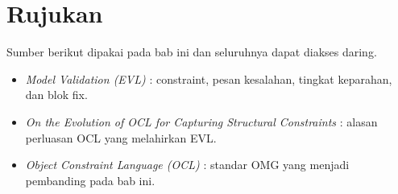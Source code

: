 \section{Rujukan}

Sumber berikut dipakai pada bab ini dan seluruhnya dapat diakses daring.

\begin{itemize}
  \item \textit{Model Validation (EVL)} \cite{doc-evl}: constraint, pesan kesalahan, tingkat keparahan, dan blok fix.
  \item \textit{On the Evolution of OCL for Capturing Structural Constraints} \cite{kolovos2009evl}: alasan perluasan OCL yang melahirkan EVL.
  \item \textit{Object Constraint Language (OCL)} \cite{omg-ocl}: standar OMG yang menjadi pembanding pada bab ini.
\end{itemize}
